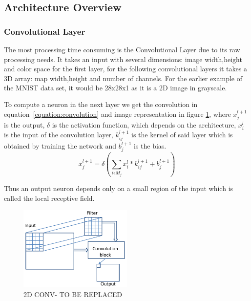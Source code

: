  \subsection{Architecture Overview}
 \label{section:Aoverview}



 \subsubsection{Convolutional Layer}
\label{section:convlayer}

\quad The most processing time consuming  is the Convolutional Layer due to its raw processing needs. 
It takes an input with several dimensions: image width,height and color space for the first layer,
for the following convolutional layers it takes a 3D array: map width,height and number of channels.
For the earlier example of the MNIST
data set, it would be 28x28x1 as it is a 2D image in grayscale.

To compute a neuron in the next layer we get the convolution in equation~\ref{equation:convolution} and image representation in figure \ref{Cl},
where $x_{j}^{l+1}$ is the output, $\delta$ is the activation function, which depends on the architecture, $x_{i}^{l}$ is the input of the convolution layer, $k_{ij}^{l+1}$ is
the kernel of said layer which is obtained by training the network and $b_{j}^{l+1}$ is the bias.
\begin{equation} \label{equation:convolution}
    \displaystyle x_{j}^{l+1}=\delta (\sum_{i \epsilon M_{j}}x_{i}^{l} * k_{ij}^{l+1}+ b_{j}^{l+1})
\end{equation}

Thus an output neuron depends only on a small region of the input which is called the local receptive field. 

\begin{figure}[!htbp]
    \centering
    \includegraphics[width=0.5\textwidth]{Figures/convolution.png}
    \caption{2D CONV- TO BE REPLACED}
    \label{Cl}
\end{figure} 

